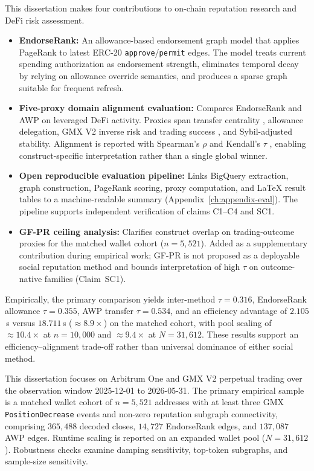 This dissertation makes four contributions to on-chain reputation research and DeFi risk assessment.
\begin{itemize}
\item \textbf{EndorseRank:} An allowance-based endorsement graph model that applies PageRank to latest ERC-20 \texttt{approve}/\texttt{permit} edges. The model treats current spending authorization as endorsement strength, eliminates temporal decay by relying on allowance override semantics, and produces a sparse graph suitable for frequent refresh.
\item \textbf{Five-proxy domain alignment evaluation:} Compares EndorseRank and AWP on leveraged DeFi activity. Proxies span transfer centrality , allowance delegation, GMX V2 inverse risk and trading success , and Sybil-adjusted stability. Alignment is reported with Spearman's $\rho$ and Kendall's $\tau$ , enabling construct-specific interpretation rather than a single global winner.
\item \textbf{Open reproducible evaluation pipeline:} Links BigQuery extraction, graph construction, PageRank scoring, proxy computation, and LaTeX result tables to a machine-readable summary (Appendix~\ref{ch:appendix-eval}). The pipeline supports independent verification of claims C1--C4 and SC1.
\item \textbf{GF-PR ceiling analysis:} Clarifies construct overlap on trading-outcome proxies for the matched wallet cohort ($n=5{,}521$). Added as a supplementary contribution during empirical work; GF-PR is not proposed as a deployable social reputation method and bounds interpretation of high $\tau$ on outcome-native families (Claim~SC1).
\end{itemize}

Empirically, the primary comparison yields inter-method $\tau=0.316$, EndorseRank allowance $\tau=0.355$, AWP transfer $\tau=0.534$, and an efficiency advantage of $2.105$\,s versus $18.711$\,s ($\approx 8.9\times$) on the matched cohort, with pool scaling of $\approx 10.4\times$ at $n=10{,}000$ and $\approx 9.4\times$ at $N=31{,}612$. These results support an efficiency--alignment trade-off rather than universal dominance of either social method.


This dissertation focuses on Arbitrum One and GMX V2 perpetual trading over the observation window 2025-12-01 to 2026-05-31. The primary empirical sample is a matched wallet cohort of $n=5{,}521$ addresses with at least three GMX \texttt{PositionDecrease} events and non-zero reputation subgraph connectivity, comprising $365{,}488$ decoded closes, $14{,}727$ EndorseRank edges, and $137{,}087$ AWP edges. Runtime scaling is reported on an expanded wallet pool ($N=31{,}612$). Robustness checks examine damping sensitivity, top-token subgraphs, and sample-size sensitivity.


